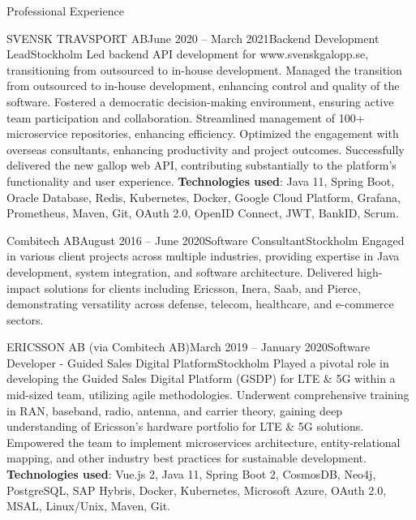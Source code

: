 \documentclass{resume}
\begin{document}
\begin{rSection}{Professional Experience}
\begin{rSubsection}{SVENSK TRAVSPORT AB}{June 2020 -- March 2021}{Backend Development Lead}{Stockholm}
\bItem Led backend API development for www.svenskgalopp.se, transitioning from outsourced to in-house development.
\bItem Managed the transition from outsourced to in-house development, enhancing control and quality of the software.
\bItem Fostered a democratic decision-making environment, ensuring active team participation and collaboration.
\bItem Streamlined management of 100+ microservice repositories, enhancing efficiency.
\bItem Optimized the engagement with overseas consultants, enhancing productivity and project outcomes.
\bItem Successfully delivered the new gallop web API, contributing substantially to the platform's functionality and user experience.
\bItem \textbf{Technologies used}: Java 11, Spring Boot, Oracle Database, Redis, Kubernetes, Docker, Google Cloud Platform, Grafana, Prometheus, Maven, Git, OAuth 2.0, OpenID Connect, JWT, BankID, Scrum.
\end{rSubsection}

\begin{rSubsection}{Combitech AB}{August 2016 -- June 2020}{Software Consultant}{Stockholm}
\bItem Engaged in various client projects across multiple industries, providing expertise in Java development, system integration, and software architecture.
\bItem Delivered high-impact solutions for clients including Ericsson, Inera, Saab, and Pierce, demonstrating versatility across defense, telecom, healthcare, and e-commerce sectors.
\end{rSubsection}

\begin{rClientSubsection}{ERICSSON AB (via Combitech AB)}{March 2019 -- January 2020}{Software Developer - Guided Sales Digital Platform}{Stockholm}
\bItem Played a pivotal role in developing the Guided Sales Digital Platform (GSDP) for LTE \& 5G within a mid-sized team, utilizing agile methodologies.
\bItem Underwent comprehensive training in RAN, baseband, radio, antenna, and carrier theory, gaining deep understanding of Ericsson's hardware portfolio for LTE \& 5G solutions.
\bItem Empowered the team to implement microservices architecture, entity-relational mapping, and other industry best practices for sustainable development.
\bItem \textbf{Technologies used}: Vue.js 2, Java 11, Spring Boot 2, CosmosDB, Neo4j, PostgreSQL, SAP Hybris, Docker, Kubernetes, Microsoft Azure, OAuth 2.0, MSAL, Linux/Unix, Maven, Git.
\end{rClientSubsection}


\end{rSection}
\end{document}

